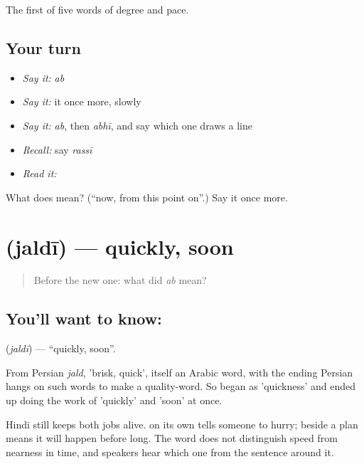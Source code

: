 \begin{grammarlens}[title={What you've built}]
The first of five words of degree and pace.
\end{grammarlens}

\subsection*{Your turn}
\begin{itemize}
\raggedright
  \item \emph{Say it:} \emph{ab}
  \item \emph{Say it:} it once more, slowly
  \item \emph{Say it:} \emph{ab}, then \emph{abhī}, and say which one draws a line
  \item \emph{Recall:} say \emph{rassī}
  \item \emph{Read it:} \textbf{}
\end{itemize}

\begin{tcolorbox}[breakable,colback=teal!4,colframe=teal!35!black,title={Before you move on}]
What does  mean? (\textquotedblleft{}now, from this point on\textquotedblright{}.) Say it once more.
\end{tcolorbox}
\section[\texorpdfstring{\hi{जल्दी} (jaldī)}{जल्दी (jaldī)}]{ (jaldī) — quickly, soon}

\label{lesson:HI-C64-quickly}



\begin{quote}
Before the new one: what did \emph{ab} mean?
\end{quote}

\subsection*{You'll want to know: }
\textbf{} (\emph{jaldī}) — \textquotedblleft{}quickly, soon\textquotedblright{}.

From Persian \emph{jald}, 'brisk, quick', itself an Arabic word, with the ending Persian hangs on such words to make a quality-word. So  began as 'quickness' and ended up doing the work of 'quickly' and 'soon' at once.

Hindi still keeps both jobs alive.  on its own tells someone to hurry;  beside a plan means it will happen before long. The word does not distinguish speed from nearness in time, and speakers hear which one from the sentence around it.

